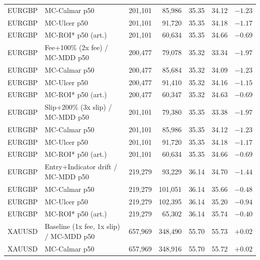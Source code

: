 \begin{table}[ht]
\begin{tabular}{llrrrrr}
EURGBP & \hspace{1em}MC-Calmar p50 & 201,101 & 85,986 & 35.35 & 34.12 & $-1.23$ \\
EURGBP & \hspace{1em}MC-Ulcer p50 & 201,101 & 91,720 & 35.35 & 34.18 & $-1.17$ \\
EURGBP & \hspace{1em}MC-ROI* p50 (art.) & 201,101 & 60,634 & 35.35 & 34.66 & $-0.69$ \\
EURGBP & Fee+100\% (2x fee) / MC-MDD p50 & 200,477 & 79,078 & 35.32 & 33.34 & $-1.97$ \\
EURGBP & \hspace{1em}MC-Calmar p50 & 200,477 & 85,684 & 35.32 & 34.09 & $-1.23$ \\
EURGBP & \hspace{1em}MC-Ulcer p50 & 200,477 & 91,410 & 35.32 & 34.16 & $-1.15$ \\
EURGBP & \hspace{1em}MC-ROI* p50 (art.) & 200,477 & 60,347 & 35.32 & 34.63 & $-0.69$ \\
EURGBP & Slip+200\% (3x slip) / MC-MDD p50 & 201,101 & 79,380 & 35.35 & 33.38 & $-1.97$ \\
EURGBP & \hspace{1em}MC-Calmar p50 & 201,101 & 85,986 & 35.35 & 34.12 & $-1.23$ \\
EURGBP & \hspace{1em}MC-Ulcer p50 & 201,101 & 91,720 & 35.35 & 34.18 & $-1.17$ \\
EURGBP & \hspace{1em}MC-ROI* p50 (art.) & 201,101 & 60,634 & 35.35 & 34.66 & $-0.69$ \\
EURGBP & Entry+Indicator drift / MC-MDD p50 & 219,279 & 93,229 & 36.14 & 34.70 & $-1.44$ \\
EURGBP & \hspace{1em}MC-Calmar p50 & 219,279 & 101,051 & 36.14 & 35.66 & $-0.48$ \\
EURGBP & \hspace{1em}MC-Ulcer p50 & 219,279 & 102,395 & 36.14 & 35.20 & $-0.94$ \\
EURGBP & \hspace{1em}MC-ROI* p50 (art.) & 219,279 & 65,302 & 36.14 & 35.74 & $-0.40$ \\
\midrule
XAUUSD & Baseline (1x fee, 1x slip) / MC-MDD p50 & 657,969 & 348,490 & 55.70 & 55.73 & $+0.02$ \\
XAUUSD & \hspace{1em}MC-Calmar p50 & 657,969 & 348,916 & 55.70 & 55.72 & $+0.02$ \\

\end{tabular}
\end{table}
